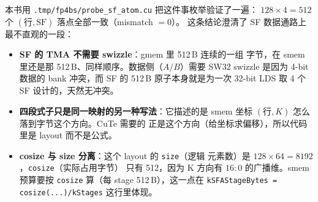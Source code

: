 本书用 \texttt{.tmp/\allowbreak fp4bs/\allowbreak probe\_sf\_atom.cu} 把这件事枚举验证了一遍：
$128\times4 = 512$ 个 $(\text{行}, \mathrm{SF})$ 落点全部一致（mismatch $=0$）。
这条结论澄清了 SF 数据通路上最不直观的一段：

\begin{itemize}[itemsep=2pt,topsep=3pt]
  \item \textbf{SF 的 TMA 不需要 swizzle}：gmem 里 512\,B 连续的一组
        字节，在 smem 里还是那 512\,B、同样顺序。数据侧（$A/B$）需要
        SW32 swizzle 是因为 4-bit 数据的 bank 冲突，而 SF 的 512\,B
        原子本身就是为一次 32-bit LDS 取 4 个 SF 设计的，天然无冲突。
  \item \textbf{四段式子只是同一映射的另一种写法}：它描述的是
        smem 坐标 $(\text{行}, K)$ 怎么落到字节这个方向。CuTe 需要的
        正是这个方向（给坐标求偏移），所以代码里是 layout 而不是公式。
  \item \textbf{cosize 与 size 分离}：这个 layout 的 \texttt{size}（逻辑
        元素数）是 $128\times64 = 8192$，\texttt{cosize}（实际占用字节）
        只有 512，因为 K 方向有 $16{:}0$ 的广播维。smem 预算要按
        \texttt{cosize} 算（每 stage 512\,B），这一点在
        \texttt{kSFAStageBytes = cosize(...)/\allowbreak kStages} 这行里体现。
\end{itemize}

